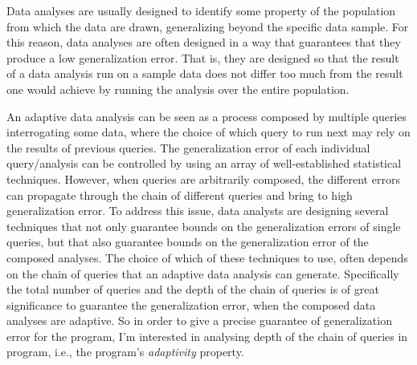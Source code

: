 \begin{abstractpage}
   Data analyses are usually designed to identify some property of the population from which the data are drawn, generalizing beyond the specific data sample. For this reason, data analyses are often designed in a way that guarantees that they produce a low generalization error.
   That is, they are designed so that the result of a data analysis run on a sample data does not differ too much from the result one would achieve by running the analysis over the entire population. 
   
   An adaptive data analysis can be seen as a process composed by multiple queries interrogating some data, where the choice of which query to run next may rely on the results of previous queries. 
   The generalization error of each individual query/analysis can be controlled by using an array of well-established statistical techniques.
   However, when queries are arbitrarily composed, the different errors can propagate through the chain of different queries and bring to high generalization error. 
   To address this issue, data analysts are designing several techniques that not only guarantee bounds on the generalization errors of single queries, but that also guarantee bounds on the generalization error of the composed analyses. 
   The choice of which of these techniques to use, 
   often depends on the chain of queries that an adaptive data analysis can generate.
   Specifically the total number of queries and the depth of the chain of queries is of great significance 
   to guarantee the generalization error, 
   when the composed data analyses are adaptive. 
   So in order to give a precise guarantee of generalization error
   for the program,
    I'm interested in analysing depth of the chain of queries in program, i.e., the program's \emph{adaptivity} property.


\end{abstractpage}
